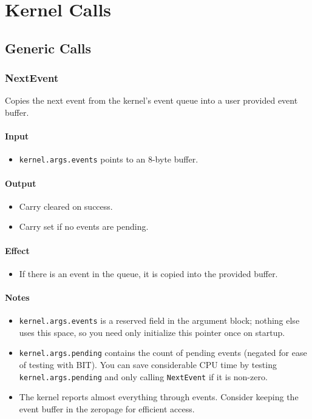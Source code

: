 \section*{Kernel Calls}

\subsection*{Generic Calls}

\subsubsection*{NextEvent}

Copies the next event from the kernel's event queue into a user provided event buffer.

\paragraph{Input}

\begin{itemize}
\item \verb+kernel.args.events+ points to an 8-byte buffer.  
\end{itemize}

\paragraph{Output}

\begin{itemize}
\item Carry cleared on success.
\item Carry set if no events are pending.
\end{itemize}

\paragraph{Effect}

\begin{itemize}
\item If there is an event in the queue, it is copied into the provided buffer.
\end{itemize}

\paragraph{Notes}

\begin{itemize}
\item \verb+kernel.args.events+ is a reserved field in the argument block; nothing else uses this space, so you need only initialize this pointer once on startup.
\item \verb+kernel.args.pending+ contains the count of pending events (negated for ease of testing with BIT).  You can save considerable CPU time by testing \verb+kernel.args.pending+ and only calling \verb+NextEvent+ if it is non-zero.
\item The kernel reports almost everything through events.  Consider keeping the event buffer in the zeropage for efficient access.
\end{itemize}



